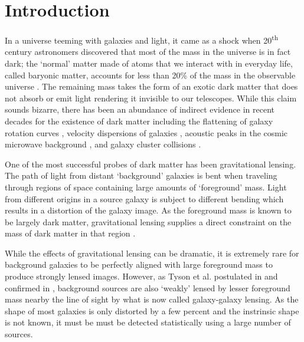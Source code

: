 \documentclass[%
 reprint,
 amsmath,amssymb,
 aps,nofootinbib
]{revtex4-1}
\begin{document}
\maketitle



\section{Introduction}

In a universe teeming with galaxies and light, it came as a shock when 20\textsuperscript{th} century astronomers discovered that most of the mass in the universe is in fact dark; the `normal' matter made of atoms that we interact with in everyday life, called baryonic matter, accounts for less than 20\% of the mass in the observable universe \cite{planck}. The remaining mass takes the form of an exotic dark matter that does not absorb or emit light rendering it invisible to our telescopes. While this claim sounds bizarre, there has been an abundance of indirect evidence in recent decades for the existence of dark matter including the flattening of galaxy rotation curves \cite{rotation_curve}, velocity dispersions of galaxies \cite{zwicky}, acoustic peaks in the cosmic microwave background \cite{planck_2015}, and galaxy cluster collisions \cite{bullet_cluster}.

One of the most successful probes of dark matter has been gravitational lensing. The path of light from distant `background' galaxies is bent when traveling through regions of space containing large amounts of `foreground' mass. Light from different origins in a source galaxy is subject to different bending which results in a distortion of the galaxy image. As the foreground mass is known to be largely dark matter, gravitational lensing supplies a direct constraint on the mass of dark matter in that region \cite{mass_constraint}.

While the effects of gravitational lensing can be dramatic, it is extremely rare for background galaxies to be perfectly aligned with large foreground mass to produce strongly lensed images. However, as Tyson et al. postulated in \cite{tyson_postulate} and confirmed in \cite{tyson_confirm}, background sources are also `weakly' lensed by lesser foreground mass nearby the line of sight by what is now called galaxy-galaxy lensing. As the shape of most galaxies is only distorted by a few percent and the instrinsic shape is not known, it must be must be detected statistically using a large number of sources.
\end{document}
